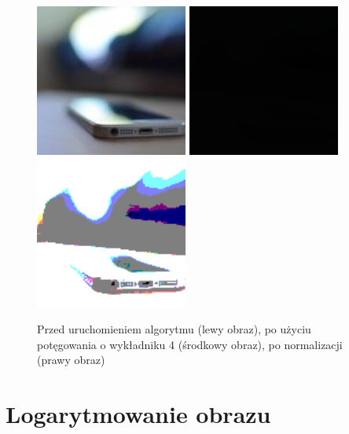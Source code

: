 \documentclass[a4paper,12pt]{book}
\begin{document}
\begin{figure}[H]
	\caption{Przed uruchomieniem algorytmu (lewy obraz), po użyciu potęgowania o wykładniku 4 (środkowy obraz), po normalizacji (prawy obraz)}
	\includegraphics[width=5cm, height=5cm]{phone-unmodified.jpg}
	\includegraphics[width=5cm, height=5cm]{3-6/root-color-phone-4.png}
	\includegraphics[width=5cm, height=5cm]{3-6/root-color-phone-4-norm.png}
\end{figure}

\section{Logarytmowanie obrazu}
\end{document}
